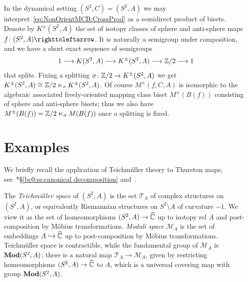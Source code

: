 \documentclass{amsart}
\begin{document}
In the dynamical setting $(S^2,C)=(S^2,A)$ we may
interpret~\eqref{eq:NonOrientMCB:CrossProd} as a semidirect product of
bisets. Denote by $K^{\pm}(S^2,A)$ the set of isotopy classes of
sphere and anti-sphere maps $f\colon (S^2,A)\selfmap$. It is naturally
a semigroup under composition, and we have a short exact sequence of
semigroups
\[1\longrightarrow K(S^2,A)\longrightarrow K^{\pm}(S^2,A)\longrightarrow  {\mathbb Z}/2\longrightarrow 1
\]
that splits. Fixing a splitting
$\sigma \colon {\mathbb Z}/2 \to K^{\pm}(S^2,A) $ we get
$K^{\pm}(S^2,A)\cong {\mathbb Z}/2 \ltimes_\sigma K^{\pm}(S^2,A)$.  Of course
$M^{\pm}(f,C,A)$ is isomorphic to the algebraic associated
freely-oriented mapping class biset $M^{\pm}(B(f))$ consisting of
sphere and anti-sphere bisets; thus we also have
$M^{\pm}(B(f))={\mathbb Z}/2\ltimes_{\sigma} M(B(f))$ once a splitting is
fixed.

\section{Examples}\label{ss:examples}
We briefly recall the application of Teichm\"uller theory to Thurston
maps; see~\cite{bartholdi-dudko:bc0}*{\S\ref{bc0:ss:canonical decomposition}} and~\cite{selinger:canonical}.

The \emph{Teichm\"uller space} of $(S^2,A)$ is the set $\mathscr T_A$
of complex structures on $(S^2,A)$, or equivalently Riemannian
structures on $S^2\setminus A$ of curvature $-1$. We view it as the
set of homeomorphisms $(S^2,A)\to{\widehat{{\mathbb C}}}$ up to isotopy rel $A$ and
post-composition by M\"obius transformations. \emph{Moduli space}
$\mathscr M_A$ is the set of embeddings $A\hookrightarrow{\widehat{{\mathbb C}}}$ up to
post-composition by M\"obius transformations. Teichm\"uller space is
contractible, while the fundamental group of $\mathscr M_A$ is
$\mathbf{\relax Mod}(S^2,A)$; there is a natural map
$\mathscr T_A\to\mathscr M_A$, given by restricting homeomorphisms
$(S^2,A)\to{\widehat{{\mathbb C}}}$ to $A$, which is a universal covering map with group
$\mathbf{\relax Mod}(S^2,A)$.
\end{document}
